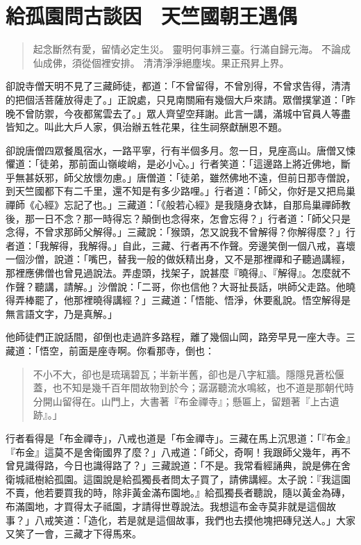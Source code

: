 
\chapter{給孤園問古談因　天竺國朝王遇偶}

\begin{quote}
起念斷然有愛，留情必定生災。
靈明何事辨三臺。行滿自歸元海。
不論成仙成佛，須從個裡安排。
清清淨淨絕塵埃。果正飛昇上界。
\end{quote}

卻說寺僧天明不見了三藏師徒，都道：「不曾留得，不曾別得，不曾求告得，清清的把個活菩薩放得走了。」正說處，只見南關廂有幾個大戶來請。眾僧撲掌道：「昨晚不曾防禦，今夜都駕雲去了。」眾人齊望空拜謝。此言一講，滿城中官員人等盡皆知之。叫此大戶人家，俱治辦五牲花果，往生祠祭獻酬恩不題。

卻說唐僧四眾餐風宿水，一路平寧，行有半個多月。忽一日，見座高山。唐僧又悚懼道：「徒弟，那前面山嶺峻峭，是必小心。」行者笑道：「這邊路上將近佛地，斷乎無甚妖邪，師父放懷勿慮。」唐僧道：「徒弟，雖然佛地不遠，但前日那寺僧說，到天竺國都下有二千里，還不知是有多少路哩。」行者道：「師父，你好是又把烏巢禪師《心經》忘記了也。」三藏道：「《般若心經》是我隨身衣缽，自那烏巢禪師教後，那一日不念？那一時得忘？顛倒也念得來，怎會忘得？」行者道：「師父只是念得，不曾求那師父解得。」三藏說：「猴頭，怎又說我不曾解得？你解得麼？」行者道：「我解得，我解得。」自此，三藏、行者再不作聲。旁邊笑倒一個八戒，喜壞一個沙僧，說道：「嘴巴，替我一般的做妖精出身，又不是那裡禪和子聽過講經，那裡應佛僧也曾見過說法。弄虛頭，找架子，說甚麼『曉得』、『解得』。怎麼就不作聲？聽講，請解。」沙僧說：「二哥，你也信他？大哥扯長話，哄師父走路。他曉得弄棒罷了，他那裡曉得講經？」三藏道：「悟能、悟淨，休要亂說。悟空解得是無言語文字，乃是真解。」

他師徒們正說話間，卻倒也走過許多路程，離了幾個山岡，路旁早見一座大寺。三藏道：「悟空，前面是座寺啊。你看那寺，倒也：
\begin{quote}
不小不大，卻也是琉璃碧瓦；半新半舊，卻也是八字紅牆。隱隱見蒼松偃蓋，也不知是幾千百年間故物到於今；潺潺聽流水鳴絃，也不道是那朝代時分開山留得在。山門上，大書著『布金禪寺』；懸匾上，留題著『上古遺跡』。」
\end{quote}

行者看得是「布金禪寺」，八戒也道是「布金禪寺」。三藏在馬上沉思道：「『布金』『布金』這莫不是舍衛國界了麼？」八戒道：「師父，奇啊！我跟師父幾年，再不曾見識得路，今日也識得路了？」三藏說道：「不是。我常看經誦典，說是佛在舍衛城祗樹給孤園。這園說是給孤獨長者問太子買了，請佛講經。太子說：『我這園不賣，他若要買我的時，除非黃金滿布園地。』給孤獨長者聽說，隨以黃金為磚，布滿園地，才買得太子祗園，才請得世尊說法。我想這布金寺莫非就是這個故事？」八戒笑道：「造化，若是就是這個故事，我們也去摸他塊把磚兒送人。」大家又笑了一會，三藏才下得馬來。

